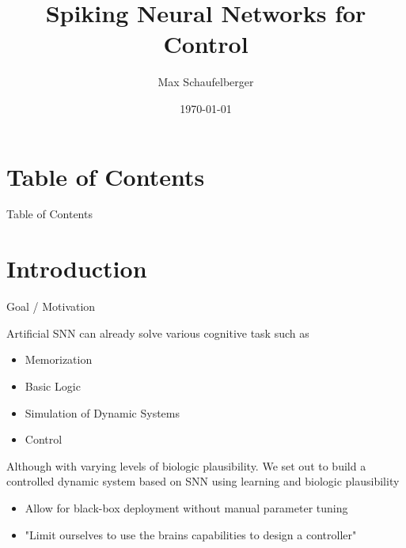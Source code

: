 \documentclass[17pt, t, lualatex]{beamer}
\title{Spiking Neural Networks for Control}
\date{\today}
\institute[KTH]{KTH Royal Institute of Technology}
\author{Max Schaufelberger}
\begin{document}
\inserttitlepage

\section*{Table of Contents}
\begin{frame}{Table of Contents}
	\tableofcontents
\end{frame}



\section{Introduction}\insertsectionpage

\begin{frame}{Goal / Motivation}
	
	Artificial SNN can already solve various cognitive task such as
	\begin{itemize}
		\item Memorization
		\item Basic Logic
		\item Simulation of Dynamic Systems
		\item Control
	\end{itemize}
	Although with varying levels of biologic plausibility.
	We set out to build a controlled dynamic system based on SNN using learning and biologic plausibility
	\begin{itemize}
		\item Allow for black-box deployment without manual parameter tuning\\
		\item "Limit ourselves to use the brains capabilities to design a controller"\\
	\end{itemize}
\end{frame}	
\end{document}
